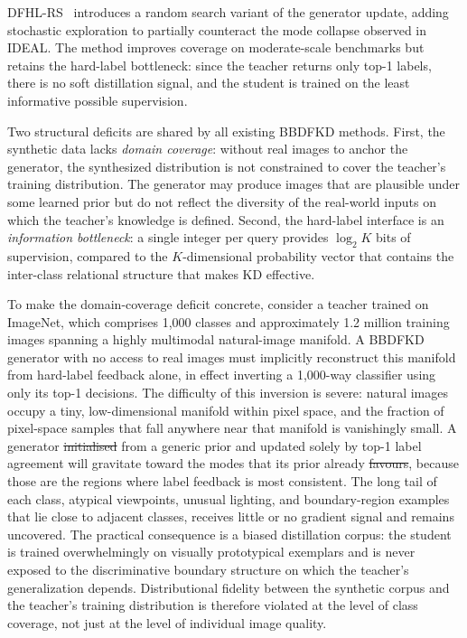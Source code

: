 \documentclass[12pt, a4paper, twoside]{book}
\makeatletter
\numberwithin{equation}{chapter}
\theoremstyle{plain}
\theoremstyle{definition}
\theoremstyle{remark}
\newenvironment{foldable}{}{}
\providecommand{\DIFaddtex}[1]{{\protect\color{blue}\uwave{#1}}} %
\providecommand{\DIFdeltex}[1]{{\protect\color{red}\sout{#1}}} %
\providecommand{\DIFaddbegin}{} %
\providecommand{\DIFaddend}{} %
\providecommand{\DIFdelbegin}{} %
\providecommand{\DIFdelend}{} %
\providecommand{\DIFadd}[1]{\texorpdfstring{\DIFaddtex{#1}}{#1}} %
\providecommand{\DIFdel}[1]{\texorpdfstring{\DIFdeltex{#1}}{}} %
\newcommand{\DIFscaledelfig}{0.5}
\newlength{\DIFdelgraphicswidth} %
\newlength{\DIFdelgraphicsheight} %
\newcommand{\DIFaddincludegraphics}[2][]{{\color{blue}\fbox{\DIFOincludegraphics[#1]{#2}}}} %
\newcommand{\DIFdelincludegraphics}[2][]{%
\sbox{\DIFdelgraphicsbox}{\DIFOincludegraphics[#1]{#2}}%
\settoboxwidth{\DIFdelgraphicswidth}{\DIFdelgraphicsbox} %
\settoboxtotalheight{\DIFdelgraphicsheight}{\DIFdelgraphicsbox} %
\scalebox{\DIFscaledelfig}{%
\parbox[b]{\DIFdelgraphicswidth}{\usebox{\DIFdelgraphicsbox}\\[-\baselineskip] \rule{\DIFdelgraphicswidth}{0em}}\llap{\resizebox{\DIFdelgraphicswidth}{\DIFdelgraphicsheight}{%
\setlength{\unitlength}{\DIFdelgraphicswidth}%
\begin{picture}(1,1)%
\thicklines\linethickness{2pt} %
{\color[rgb]{1,0,0}\put(0,0){\framebox(1,1){}}}%
{\color[rgb]{1,0,0}\put(0,0){\line( 1,1){1}}}%
{\color[rgb]{1,0,0}\put(0,1){\line(1,-1){1}}}%
\end{picture}%
}\hspace*{3pt}}} %
} %
\DeclareRobustCommand{\DIFaddbegin}{\DIFOaddbegin \let\includegraphics\DIFaddincludegraphics} %
\DeclareRobustCommand{\DIFaddend}{\DIFOaddend \let\includegraphics\DIFOincludegraphics} %
\DeclareRobustCommand{\DIFdelbegin}{\DIFOdelbegin \let\includegraphics\DIFdelincludegraphics} %
\DeclareRobustCommand{\DIFdelend}{\DIFOaddend \let\includegraphics\DIFOincludegraphics} %
\let\sout@orig\sout %
\renewcommand{\sout}[1]{\ifmmode\text{\sout@orig{\ensuremath{#1}}}\else\sout@orig{#1}\fi} %
\makeatother
\begin{document}
\begin{foldable}
  DFHL-RS~\cite{yuan2024data} introduces a random search variant of the generator update, adding stochastic exploration to partially counteract the mode collapse observed in IDEAL.
  The method improves coverage on moderate-scale benchmarks but retains the hard-label bottleneck: since the teacher returns only top-1 labels, there is no soft distillation signal, and the student is trained on the least informative possible supervision.
\end{foldable}

\begin{foldable}
  Two structural deficits are shared by all existing \ac{BBDFKD} methods.
  First, the synthetic data lacks \textit{domain coverage}: without real images to anchor the generator, the synthesized distribution is not constrained to cover the teacher's training distribution.
  The generator may produce images that are plausible under some learned prior but do not reflect the diversity of the real-world inputs on which the teacher's knowledge is defined.
  Second, the hard-label interface is an \textit{information bottleneck}: a single integer per query provides $\log_2 K$ bits of supervision, compared to the $K$-dimensional probability vector that contains the inter-class relational structure that makes \ac{KD} effective.
\end{foldable}

\begin{foldable}
  To make the domain-coverage deficit concrete, consider a teacher trained on ImageNet, which comprises 1{,}000 classes and approximately 1.2 million training images spanning a highly multimodal natural-image manifold.
  A \ac{BBDFKD} generator with no access to real images must implicitly reconstruct this manifold from hard-label feedback alone, in effect inverting a 1{,}000-way classifier using only its top-1 decisions.
  The difficulty of this inversion is severe: natural images occupy a tiny, low-dimensional manifold within pixel space, and the fraction of pixel-space samples that fall anywhere near that manifold is vanishingly small.
  A generator \DIFdelbegin \DIFdel{initialised }\DIFdelend \DIFaddbegin \DIFadd{initialized }\DIFaddend from a generic prior and updated solely by top-1 label agreement will gravitate toward the modes that its prior already \DIFdelbegin \DIFdel{favours}\DIFdelend \DIFaddbegin \DIFadd{favors}\DIFaddend , because those are the regions where label feedback is most consistent.
  The long tail of each class, atypical viewpoints, unusual lighting, and boundary-region examples that lie close to adjacent classes, receives little or no gradient signal and remains uncovered.
  The practical consequence is a biased distillation corpus: the student is trained overwhelmingly on visually prototypical exemplars and is never exposed to the discriminative boundary structure on which the teacher's generalization depends.
  Distributional fidelity between the synthetic corpus and the teacher's training distribution is therefore violated at the level of class coverage, not just at the level of individual image quality.
\end{foldable}
\end{document}
